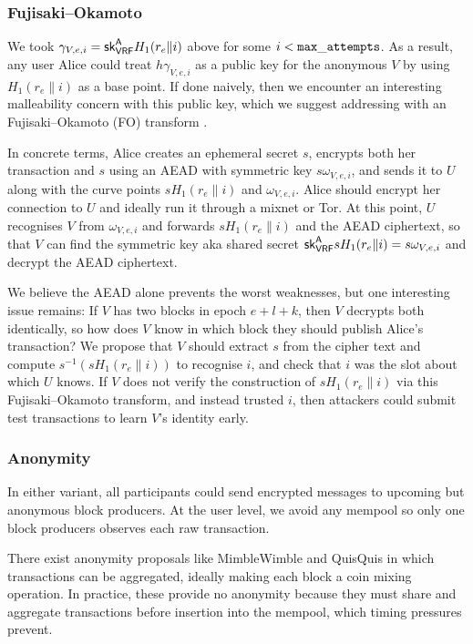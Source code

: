 \subsubsection{Fujisaki–Okamoto}

We took $\gamma_{V,e,i} = \mathsf{sk}_{\mathsf{VRF}}^{\mathsf{A}} H_1(r_e \| i)$ above for some $i < \mathtt{max\_attempts}$.  As a result, any user Alice could treat $h \gamma_{V,e,i}$ as a public key for the anonymous $V$ by using $H_1(r_e \| i)$ as a base point.  If done naively, then we encounter an interesting malleability concern with this public key, which we suggest addressing with an Fujisaki–Okamoto (FO) transform \cite{FO_transform}.  

In concrete terms, Alice creates an ephemeral secret $s$, encrypts both her transaction and $s$ using an AEAD with symmetric key $s \omega_{V,e,i}$, and sends it to $U$ along with the curve points $s H_1(r_e \| i)$ and $\omega_{V,e,i}$.  Alice should encrypt her connection to $U$ and ideally run it through a mixnet or Tor.  At this point, $U$ recognises $V$ from $\omega_{V,e,i}$ and forwards $s H_1(r_e \| i)$ and the AEAD ciphertext, so that $V$ can find the symmetric key aka shared secret $\mathsf{sk}_{\mathsf{VRF}}^{\mathsf{A}} s H_1(r_e \| i) = s \omega_{V,e,i}$ and decrypt the AEAD ciphertext.

We believe the AEAD alone prevents the worst weaknesses, but one interesting issue remains:  If $V$ has two blocks in epoch $e+l+k$, then $V$ decrypts both identically, so how does $V$ know in which block they should publish Alice's transaction?  We propose that $V$ should extract $s$ from the cipher text and compute $s^{-1} (s H_1(r_e \| i))$ to recognise $i$, and check that $i$ was the slot about which $U$ knows.  If $V$ does not verify the construction of $s H_1(r_e \| i)$ via this Fujisaki–Okamoto transform, and instead trusted $i$, then attackers could submit test transactions to learn $V$'s identity early. 


\subsubsection{Anonymity}

In either variant, all participants could send encrypted messages to upcoming but anonymous block producers.  At the user level, we avoid any mempool so only one block producers observes each raw transaction.  

There exist anonymity proposals like MimbleWimble \cite{MimbleWimble} and QuisQuis \cite{QuisQuis} in which transactions can be aggregated, ideally making each block a coin mixing operation.  In practice, these provide no anonymity because they must share and aggregate transactions before insertion into the mempool, which timing pressures prevent.  

